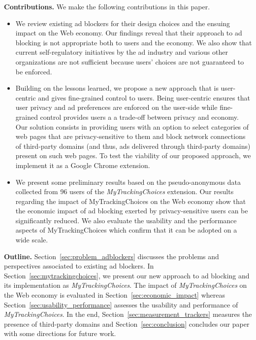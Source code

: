 \documentclass[conference]{IEEEtran}
\begin{document}
\textbf{Contributions.} We make the following contributions in this paper.
\begin{itemize}
\item We review existing ad blockers for their design choices and the ensuing impact on the Web economy. Our findings reveal that their approach to ad blocking is not appropriate both to users and the economy. We also show that current self-regulatory initiatives by the ad industry and various other organizations are not sufficient because users' choices are not guaranteed to be enforced.

\item Building on the lessons learned, we propose a new approach that is user-centric and gives fine-grained control to users.
Being user-centric ensures that user privacy and ad preferences are enforced on the user-side while fine-grained control provides users a a trade-off between privacy and economy.
Our solution consists in providing users with an option to select categories of web pages that are privacy-sensitive to them and block network connections of third-party domains (and thus, ads delivered through third-party domains) present on such web pages.
To test the viability of our proposed approach, we implement it as a Google Chrome extension.

\item We present some preliminary results based on the pseudo-anonymous data collected from 96 users of the \emph{MyTrackingChoices} extension. Our results regarding the impact of MyTrackingChoices on the Web economy show that the economic impact of ad blocking exerted by privacy-sensitive users can be significantly reduced. We also evaluate the usability and the performance aspects of MyTrackingChoices which confirm that it can be adopted on a wide scale.
\end{itemize}




\textbf{Outline.}
Section~\ref{sec:problem_adblockers} discusses the problems and perspectives associated to existing ad blockers. In Section~\ref{sec:mytrackingchoices}, we present our new approach to ad blocking and its implementation as \emph{MyTrackingChoices}. The impact of \emph{MyTrackingChoices} on the Web economy is evaluated in Section~\ref{sec:economic_impact} whereas Section~\ref{sec:usability_performance} assesses the usability and performance of \emph{MyTrackingChoices}. In the end, Section~\ref{sec:measurement_trackers} measures the presence of third-party domains and Section~\ref{sec:conclusion} concludes our paper with some directions for future work.
\end{document}
